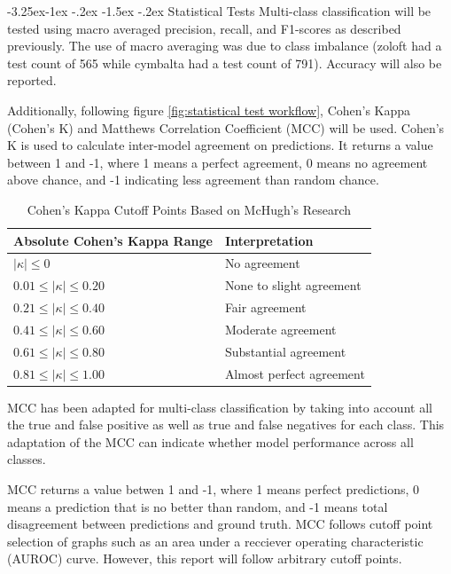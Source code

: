 \documentclass[10.7pt, onecolumn]{article}
\makeatletter
\renewcommand\subsubsection{\@startsection{subsubsection}{3}{\z@}%
	{-3.25ex\@plus -1ex \@minus -.2ex}%
    {-1.5ex \@plus -.2ex}%
    {\normalfont\itshape}}
\makeatother
\begin{document}
\subsubsection{Statistical Tests}
Multi-class classification will be tested using macro averaged precision, recall, and F1-scores as described previously. The use of macro averaging was due to class imbalance (zoloft had a test count of 565 while cymbalta had a test count of 791). Accuracy will also be reported.

Additionally, following figure \ref{fig:statistical test workflow}, Cohen's Kappa\cite{d4} (Cohen's K) and Matthews Correlation Coefficient (MCC) will be used. Cohen's K is used to calculate inter-model agreement on predictions. It returns a value between 1 and -1, where 1 means a perfect agreement, 0 means no agreement above chance, and -1 indicating less agreement than random chance.

\begin{table}[H]
  \centering
  \small
  \begin{tabular}{|p{4cm}|p{3cm}|}
    \hline
    \textbf{Absolute Cohen's Kappa Range} & \textbf{Interpretation} \\
    \hline
    $|\kappa| \leq 0$ & No agreement \\
    \hline
    $0.01 \leq |\kappa| \leq 0.20$ & None to slight agreement \\
    \hline
    $0.21 \leq |\kappa| \leq 0.40$ & Fair agreement \\
    \hline
    $0.41 \leq |\kappa| \leq 0.60$ & Moderate agreement \\
    \hline
    $0.61 \leq |\kappa| \leq 0.80$ & Substantial agreement \\
    \hline
    $0.81 \leq |\kappa| \leq 1.00$ & Almost perfect agreement \\
    \hline
  \end{tabular}
  \caption{Cohen's Kappa Cutoff Points Based on McHugh's Research \cite{cohen}}
  \label{tab:kappaInterpretation}
\end{table}

MCC has been adapted for multi-class classification by taking into account all the true and false positive as well as true and false negatives for each class\cite{mccmulticlass}. This adaptation of the MCC can indicate whether model performance across all classes.

MCC returns a value betwen 1 and -1, where 1 means perfect predictions, 0 means a prediction that is no better than random, and -1 means total disagreement between predictions and ground truth. MCC follows cutoff point selection of graphs such as an area under a recciever operating characteristic (AUROC) curve\cite{articlesss}\cite{Yang_Berdine_2017}. However, this report will follow arbitrary cutoff points.
\end{document}
